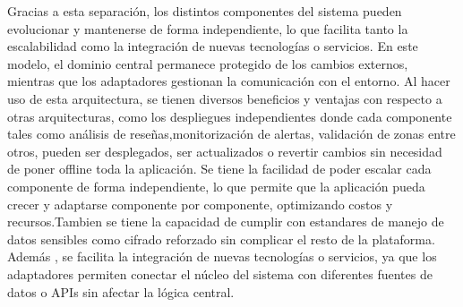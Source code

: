 \begin{itemize}
\begin{itemize}
Gracias a esta separación, los distintos componentes del sistema pueden evolucionar y mantenerse de forma independiente, lo que facilita tanto la escalabilidad como la integración de nuevas tecnologías o servicios. En este modelo, el dominio central permanece protegido de los cambios externos, mientras que los adaptadores gestionan la comunicación con el entorno.
Al hacer uso de esta arquitectura, se tienen diversos beneficios y ventajas con respecto a otras arquitecturas, como los despliegues independientes donde cada componente tales como análisis de reseñas,monitorización de alertas, validación de zonas entre otros, pueden ser desplegados, ser actualizados o revertir cambios sin necesidad de poner offline toda la aplicación. 
Se tiene la facilidad de poder escalar cada componente de forma independiente, lo que permite que la aplicación pueda crecer y adaptarse componente por componente, optimizando costos y recursos.Tambien se tiene la capacidad de cumplir con estandares de manejo de datos sensibles como cifrado reforzado sin complicar el resto de la plataforma. Además , se facilita la integración de nuevas tecnologías o servicios, ya que los adaptadores permiten conectar el núcleo del sistema con diferentes fuentes de datos o APIs sin afectar la lógica central.


\end{itemize}
\end{itemize}
